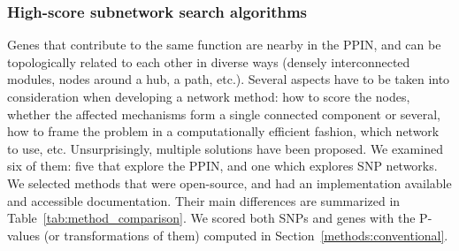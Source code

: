\documentclass[10pt,letterpaper]{article}
\begin{document}
\subsubsection{High-score subnetwork search algorithms}
\label{methods:methods}

Genes that contribute to the same function are nearby in the PPIN, and can be topologically related to each other in diverse ways (densely interconnected modules, nodes around a hub, a path, etc.). Several aspects have to be taken into consideration when developing a network method: how to score the nodes, whether the affected mechanisms form a single connected component or several, how to frame the problem in a computationally efficient fashion, which network to use, etc. Unsurprisingly, multiple solutions have been proposed. We examined six of them: five that explore the PPIN, and one which explores SNP networks. We selected methods that were open-source, and had an implementation available and accessible documentation. Their main differences are summarized in Table~\ref{tab:method_comparison}. We scored both SNPs and genes with the P-values (or transformations of them) computed in Section~\ref{methods:conventional}.
\end{document}
